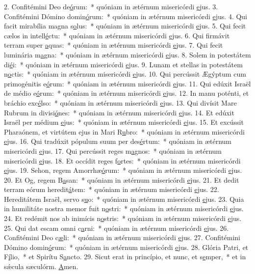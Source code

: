 2. Confitémini Deo de\uline{ó}rum:~* quóniam in ætérnum misericórdi \uline{e}jus.
3. Confitémini Dómino domin\uline{ó}rum:~* quóniam in ætérnum misericórdi \uline{e}jus.
4. Qui facit mirabília magna s\uline{o}lus:~* quóniam in ætérnum misericórdi \uline{e}jus.
5. Qui fecit cælos in intell\uline{é}ctu:~* quóniam in ætérnum misericórdi \uline{e}jus.
6. Qui firmávit terram super \uline{a}quas:~* quóniam in ætérnum misericórdi \uline{e}jus.
7. Qui fecit luminária m\uline{a}gna:~* quóniam in ætérnum misericórdi \uline{e}jus.
8. Solem in potestátem di\uline{é}i:~* quóniam in ætérnum misericórdi \uline{e}jus.
9. Lunam et stellas in potestátem n\uline{o}ctis:~* quóniam in ætérnum misericórdi \uline{e}jus.
10. Qui percússit Ægýptum cum primogénitis e\uline{ó}rum:~* quóniam in ætérnum misericórdi \uline{e}jus.
11. Qui edúxit Israël de médio e\uline{ó}rum:~* quóniam in ætérnum misericórdi \uline{e}jus.
12. In manu poténti, et bráchio exc\uline{é}lso:~* quóniam in ætérnum misericórdi \uline{e}jus.
13. Qui divísit Mare Rubrum in divisi\uline{ó}nes:~* quóniam in ætérnum misericórdi \uline{e}jus.
14. Et edúxit Israël per médium \uline{e}jus:~* quóniam in ætérnum misericórdi \uline{e}jus.
15. Et excússit Pharaónem, et virtútem ejus in Mari R\uline{u}bro:~* quóniam in ætérnum misericórdi \uline{e}jus.
16. Qui tradúxit pópulum suum per des\uline{é}rtum:~* quóniam in ætérnum misericórdi \uline{e}jus.
17. Qui percússit reges m\uline{a}gnos:~* quóniam in ætérnum misericórdi \uline{e}jus.
18. Et occídit reges f\uline{o}rtes:~* quóniam in ætérnum misericórdi \uline{e}jus.
19. Sehon, regem Amorrhæ\uline{ó}rum:~* quóniam in ætérnum misericórdi \uline{e}jus.
20. Et Og, regem B\uline{a}san:~* quóniam in ætérnum misericórdi \uline{e}jus.
21. Et dedit terram eórum heredit\uline{á}tem:~* quóniam in ætérnum misericórdi \uline{e}jus.
22. Hereditátem Israël, servo s\uline{u}o:~* quóniam in ætérnum misericórdi \uline{e}jus.
23. Quia in humilitáte nostra memor fuit n\uline{o}stri:~* quóniam in ætérnum misericórdi \uline{e}jus.
24. Et redémit nos ab inimícis n\uline{o}stris:~* quóniam in ætérnum misericórdi \uline{e}jus.
25. Qui dat escam omni c\uline{a}rni:~* quóniam in ætérnum misericórdi \uline{e}jus.
26. Confitémini Deo c\uline{æ}li:~* quóniam in ætérnum misericórdi \uline{e}jus.
27. Confitémini Dómino domin\uline{ó}rum:~* quóniam in ætérnum misericórdi \uline{e}jus.
28. Glória Patri, et F\uline{í}lio,~* et Spirítu S\uline{a}ncto.
29. Sicut erat in princípio, et nunc, et s\uline{e}mper,~* et in sǽcula sæculórm. \uline{A}men.
